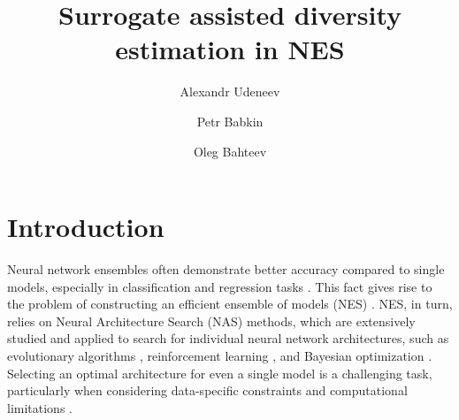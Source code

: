 \documentclass[USenglish]{article}
\theoremstyle{dgthm}
\begin{document}
	
  \aop
\title{Surrogate assisted diversity estimation in NES}

\author[1]{Alexandr Udeneev}
\author[2]{Petr Babkin}
\author[3]{Oleg Bahteev}




	




\maketitle

\section{Introduction}

Neural network ensembles often demonstrate better accuracy compared to single models, especially in classification and regression tasks \cite{E_Ren_2016, Hansen1990}. This fact gives rise to the problem of constructing an efficient ensemble of models (NES) \cite{Zaidi2021}. NES, in turn, relies on Neural Architecture Search (NAS) methods, which are extensively studied and applied to search for individual neural network architectures, such as evolutionary algorithms \cite{real2017large, real2019regularized}, reinforcement learning \cite{Zoph2017, xie2018snas, Liu2023}, and Bayesian optimization \cite{jin2019auto, kandasamy2018neural}. Selecting an optimal architecture for even a single model is a challenging task, particularly when considering data-specific constraints and computational limitations \cite{B_Swarup_2023}.
\end{document}
